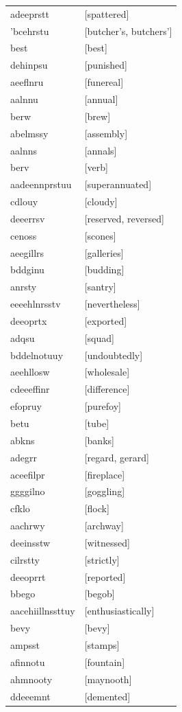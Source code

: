 \documentclass{article}
\begin{document}
\begin{tabular}{ll}
adeeprstt & [spattered] \\
'bcehrstu & [butcher's, butchers'] \\
best & [best] \\
dehinpsu & [punished] \\
aeeflnru & [funereal] \\
aalnnu & [annual] \\
berw & [brew] \\
abelmssy & [assembly] \\
aalnns & [annals] \\
berv & [verb] \\
aadeennprstuu & [superannuated] \\
cdlouy & [cloudy] \\
deeerrsv & [reserved, reversed] \\
cenoss & [scones] \\
aeegillrs & [galleries] \\
bddginu & [budding] \\
anrsty & [santry] \\
eeeehlnrsstv & [nevertheless] \\
deeoprtx & [exported] \\
adqsu & [squad] \\
bddelnotuuy & [undoubtedly] \\
aeehllosw & [wholesale] \\
cdeeeffinr & [difference] \\
efopruy & [purefoy] \\
betu & [tube] \\
abkns & [banks] \\
adegrr & [regard, gerard] \\
aceefilpr & [fireplace] \\
ggggilno & [goggling] \\
cfklo & [flock] \\
aachrwy & [archway] \\
deeinsstw & [witnessed] \\
cilrstty & [strictly] \\
deeoprrt & [reported] \\
bbego & [begob] \\
aacehiillnssttuy & [enthusiastically] \\
bevy & [bevy] \\
ampsst & [stamps] \\
afinnotu & [fountain] \\
ahmnooty & [maynooth] \\
ddeeemnt & [demented] \\

\end{tabular}
\end{document}
